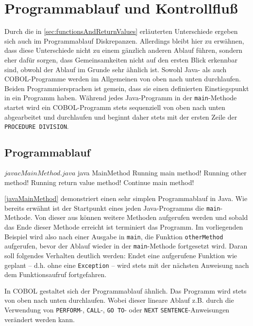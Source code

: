 \section{Programmablauf und Kontrollfluß}\label{programmablauf}
Durch die in \autoref{sec:functionsAndReturnValues} erläuterten Unterschiede ergeben sich auch im Programmablauf Diskrepanzen. Allerdings bleibt hier zu erwähnen, dass diese Unterschiede nicht zu einem gänzlich anderen Ablauf führen, sondern eher dafür sorgen, dass Gemeinsamkeiten nicht auf den ersten Blick erkennbar sind, obwohl der Ablauf im Grunde sehr ähnlich ist. Sowohl Java- als auch COBOL-Programme werden im Allgemeinen von oben nach unten durchlaufen. Beiden Programmiersprachen ist gemein, dass sie einen definierten Einstiegspunkt in ein Programm haben. Während jedes Java-Programm in der \texttt{main}-Methode startet wird ein COBOL-Programm stets sequenziell von oben nach unten abgearbeitet und durchlaufen und beginnt daher stets mit der ersten Zeile der \texttt{PROCEDURE DIVISION}.

\subsection{Programmablauf}
\sepCodeAndOutputCheck
\begin{shellwindow}
$ javac MainMethod.java 
$ java MainMethod
Running main method!
Running other method!
Running return value method!
Continue main method!
\end{shellwindow}

\autoref{javaMainMethod} demonstriert einen sehr simplen Programmablauf in Java. Wie bereits erwähnt ist der Startpunkt eines jeden Java-Programms die \texttt{main}-Methode. Von dieser aus können weitere Methoden aufgerufen werden und sobald das Ende dieser Methode erreicht ist terminiert das Programm. Im vorliegenden Beispiel wird also nach einer Ausgabe in \texttt{main}, die Funktion \texttt{otherMethod} aufgerufen, bevor der Ablauf wieder in der \texttt{main}-Methode fortgesetzt wird. Daran soll folgendes Verhalten deutlich werden: Endet eine aufgerufene Funktion wie geplant -- d.h. ohne eine \texttt{Exception} -- wird stets mit der nächsten Anweisung nach dem Funktionsaufruf fortgefahren. 

In COBOL gestaltet sich der Programmablauf ähnlich. Das Programm wird stets von oben nach unten durchlaufen. Wobei dieser lineare Ablauf z.B. durch die Verwendung von \texttt{PERFORM}-, \texttt{CALL}-, \texttt{GO TO}- oder \texttt{NEXT} \texttt{SENTENCE}-Anweisungen verändert werden kann.

